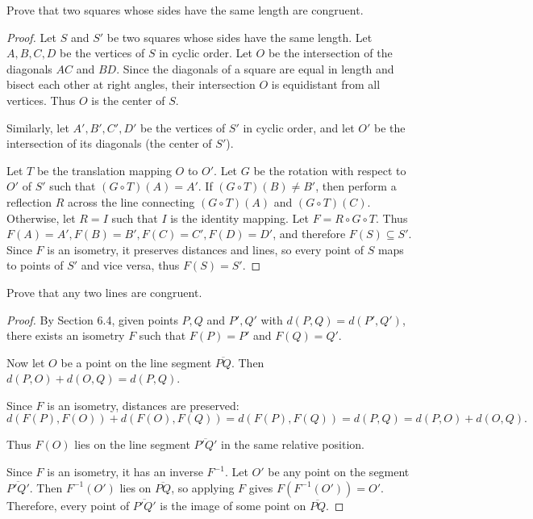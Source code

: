 \begin{tcolorbox}[title=Problem 3, breakable]
    Prove that two squares whose sides have the 
        same length are congruent.
\end{tcolorbox}

\begin{proof}
    Let $S$ and $S'$ be two squares whose sides have the same length.
    Let $A, B, C, D$ be the vertices of $S$ in cyclic order.
    Let $O$ be the intersection of the diagonals $AC$ and $BD$.
    Since the diagonals of a square are equal in length and bisect each other
        at right angles, their intersection $O$ is equidistant from all vertices.
    Thus $O$ is the center of $S$.

    Similarly, let $A', B', C', D'$ be the vertices of $S'$ in cyclic order,
    and let $O'$ be the intersection of its diagonals (the center of $S'$).

    Let $T$ be the translation mapping $O$ to $O'$.
    Let $G$ be the rotation with respect to $O'$
        of $S'$ such that $(G \circ T)(A) = A'$.
    If $(G \circ T)(B) \neq B'$, then perform  
        a reflection $R$ across the line connecting $(G \circ T)(A)$ and $(G \circ T)(C)$.
    Otherwise, let $R = I$ such that $I$ is the identity mapping.
    Let $F = R \circ G \circ T$.
    Thus $F(A) = A', F(B) = B', F(C) = C', F(D) = D'$, 
        and therefore $F(S) \subseteq S'$.
    Since $F$ is an isometry, it preserves distances and lines, so 
    every point of $S$ maps to points of $S'$ and vice versa, thus $F(S) = S'$.
\end{proof}

\begin{tcolorbox}[title=Problem 4, breakable]
    Prove that any two lines are congruent.
\end{tcolorbox}

\begin{proof}
    By Section 6.4, given points $P, Q$ and $P', Q'$ with $d(P,Q) = d(P',Q')$,
    there exists an isometry $F$ such that $F(P) = P'$ and $F(Q) = Q'$.

    Now let $O$ be a point on the line segment $\overline{PQ}$. 
    Then $d(P,O) + d(O,Q) = d(P,Q)$.

    Since $F$ is an isometry, distances are preserved:
    \[
        d(F(P), F(O)) + d(F(O), F(Q)) = d(F(P), F(Q)) = d(P,Q) = d(P,O)+d(O,Q).
    \]

    Thus $F(O)$ lies on the line segment $\overline{P'Q'}$ in the same relative position.

    Since $F$ is an isometry, it has an inverse $F^{-1}$. 
    Let $O'$ be any point on the segment $\overline{P'Q'}$. 
    Then $F^{-1}(O')$ lies on $\overline{PQ}$, so applying $F$ gives $F(F^{-1}(O')) = O'$.
    Therefore, every point of $\overline{P'Q'}$ is the image of some point on $\overline{PQ}$.
\end{proof}

